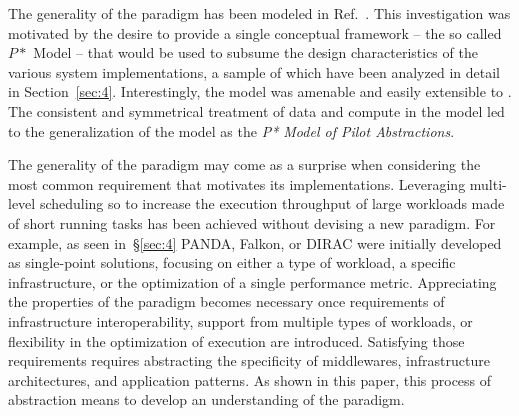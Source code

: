 \documentclass{sig-alternate}
\begin{document}
The generality of the \pilot paradigm has been modeled in
Ref.~\cite{Luckow:2008la}. This investigation was motivated by the
desire to provide a single conceptual framework -- the so called $P*$
Model -- that would be used to subsume the design characteristics of the
various \pilot system implementations, a sample of which have been
analyzed in detail in Section~\ref{sec:4}.  Interestingly, the \pstar model was
amenable and easily extensible to \pilotdata.  The consistent and
symmetrical treatment of data and compute in the model led to the
generalization of the model as the {\it P* Model of Pilot Abstractions}.


The generality of the \pilot paradigm may come as a surprise when
considering the most common requirement that motivates its
implementations. Leveraging multi-level scheduling so to increase the
execution throughput of large workloads made of short running tasks has
been achieved without devising a new paradigm. For example, as seen
in~\S\ref{sec:4} PANDA, Falkon, or DIRAC were initially developed as
single-point solutions, focusing on either a type of workload, a
specific infrastructure, or the optimization of a single performance
metric. Appreciating the properties of the \pilot paradigm becomes
necessary once requirements of infrastructure interoperability, support
from multiple types of workloads, or flexibility in the optimization of
execution are introduced. Satisfying those requirements requires
abstracting the specificity of middlewares, infrastructure
architectures, and application patterns. As shown in this paper, this
process of abstraction means to develop an understanding of the \pilot
paradigm.
\end{document}
